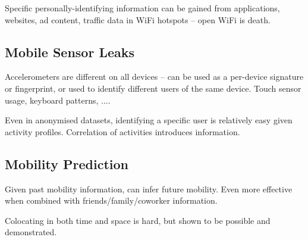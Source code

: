 \documentclass[a4paper, 11pt]{article}
\begin{document}
{{        Specific personally-identifying information can be gained from applications, websites, ad content, traffic data in WiFi hotspots -- open WiFi is death.
    }
    \subsection*{Mobile Sensor Leaks}
    {
        Accelerometers are different on all devices -- can be used as a per-device signature or fingerprint, or used to identify different users of the same device. Touch sensor usage, keyboard patterns, .... 
        
        Even in anonymised datasets, identifying a specific user is relatively easy given activity profiles. Correlation of activities introduces information.
    }
    \subsection*{Mobility Prediction}
    {
        Given past mobility information, can infer future mobility. Even more effective when combined with friends/family/coworker information.

        Colocating in both time and space is hard, but shown to be possible and demonstrated.
    }
}
\end{document}
